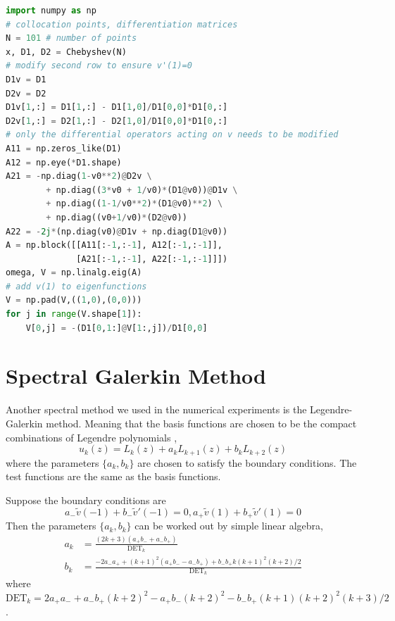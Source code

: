 \begin{lstlisting}[language=Python, float, floatplacement=H, caption={Pseudocode for solving polynomial eigenvalue problem using spectral collocation with fixed-open boundary condition.}, label=code:spectral-collocation-fixed-open]
import numpy as np
# collocation points, differentiation matrices	
N = 101 # number of points
x, D1, D2 = Chebyshev(N)	
# modify second row to ensure v'(1)=0 
D1v = D1
D2v = D2
D1v[1,:] = D1[1,:] - D1[1,0]/D1[0,0]*D1[0,:]
D2v[1,:] = D2[1,:] - D2[1,0]/D1[0,0]*D1[0,:]
# only the differential operators acting on v needs to be modified
A11 = np.zeros_like(D1)
A12 = np.eye(*D1.shape)
A21 = -np.diag(1-v0**2)@D2v \
        + np.diag((3*v0 + 1/v0)*(D1@v0))@D1v \
        + np.diag((1-1/v0**2)*(D1@v0)**2) \
        + np.diag((v0+1/v0)*(D2@v0))
A22 = -2j*(np.diag(v0)@D1v + np.diag(D1@v0))
A = np.block([[A11[:-1,:-1], A12[:-1,:-1]],
              [A21[:-1,:-1], A22[:-1,:-1]]])
omega, V = np.linalg.eig(A)
# add v(1) to eigenfunctions
V = np.pad(V,((1,0),(0,0)))
for j in range(V.shape[1]):
    V[0,j] = -(D1[0,1:]@V[1:,j])/D1[0,0]
\end{lstlisting}


\section{Spectral Galerkin Method}
Another spectral method we used in the numerical experiments is the Legendre-Galerkin method. Meaning that the basis functions are chosen to be the compact combinations of Legendre polynomials \cite{shen_tang_etal_spectral_2011},
\begin{equation}
	u_k(z) = L_k(z) + a_kL_{k+1}(z) + b_kL_{k+2}(z)
\end{equation}
where the parameters $\{a_k,b_k\}$ are chosen to satisfy the boundary conditions. The test functions are the same as the basis functions.

Suppose the boundary conditions are
\[ a_{-}\tilde{v}(-1) + b_{-}\tilde{v}'(-1) = 0, a_{+}\tilde{v}(1) + b_{+}\tilde{v}'(1) = 0  \]
Then the parameters $\{a_k,b_k\}$ can be worked out by simple linear algebra,
\begin{equation}
	\begin{aligned}
		a_k & = \frac{(2k+3)(a_{+}b_{-} + a_{-}b_{+})}{\text{DET}_k}                                             \\
		b_k & = \frac{-2a_{-}a_{+} + (k+1)^2(a_{+}b_{-} - a_{-}b_{+}) + b_{-}b_{+}k(k+1)^2(k+2)/2}{\text{DET}_k}
	\end{aligned}
\end{equation}
where $\text{DET}_k = 2a_{+}a_{-} + a_{-}b_{+}(k+2)^2 - a_{+}b_{-}(k+2)^2 - b_{-}b_{+}(k+1)(k+2)^2(k+3)/2$.

